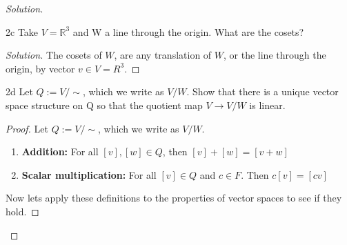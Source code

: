 \documentclass{article}
\newcommand{\R}{\mathbb{R}}
\newcommand{\rarr}[0]{\rightarrow}
\newenvironment{solution}
{\renewcommand\qedsymbol{$\blacksquare$}\begin{proof}[Solution]}
		{\end{proof}}
\begin{document}
\begin{solution}
	\begin{claim}{2c}
		Take $V = \R^3$ and W a line through the origin. What are the cosets?
	\end{claim}
	\begin{solution}
		The cosets of $W$, are any translation of $W$, or the line through the origin, by vector $v \in V = R^3$.
	\end{solution}

	\begin{claim}{2d}
		Let $Q := V/\sim$, which we write as $V/W$.
		Show that there is a unique vector space structure on Q so that the quotient map $V \rarr V/W$ is linear.
	\end{claim}
	\begin{proof}
		Let $Q := V/\sim$, which we write as $V/W$.

		\begin{enumerate}{}
			\item \textbf{Addition:} For all $[v], [w] \in Q$, then $[v] + [w] = [v + w]$
			\item \textbf{Scalar multiplication:} For all $[v] \in Q$ and $c \in F$. Then $c[v] = [cv]$
		\end{enumerate}

		Now lets apply these definitions to the properties of vector spaces to see if they hold.


\end{proof}
\end{solution}
\end{document}
